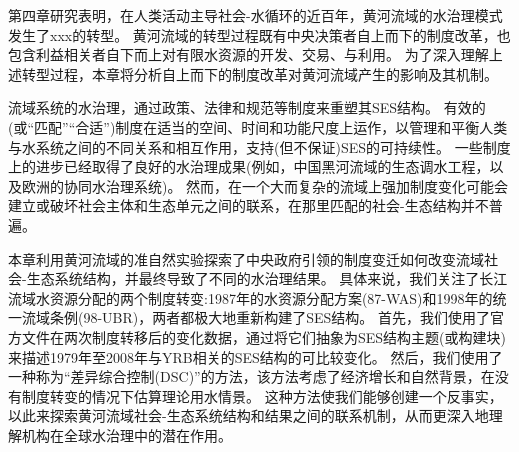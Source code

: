 第四章研究表明，在人类活动主导社会-水循环的近百年，黄河流域的水治理模式发生了xxx的转型。
黄河流域的转型过程既有中央决策者自上而下的制度改革，也包含利益相关者自下而上对有限水资源的开发、交易、与利用。
为了深入理解上述转型过程，本章将分析自上而下的制度改革对黄河流域产生的影响及其机制。

流域系统的水治理，通过政策、法律和规范等制度来重塑其SES结构。
有效的(或“匹配”“合适”)制度在适当的空间、时间和功能尺度上运作，以管理和平衡人类与水系统之间的不同关系和相互作用，支持(但不保证)SES的可持续性\cite{epstein2015, wang2019d}。
一些制度上的进步已经取得了良好的水治理成果(例如，中国黑河流域的生态调水工程\cite{wang2019d}，以及欧洲的协同水治理系统\cite{green2013})。
然而，在一个大而复杂的流域上强加制度变化可能会建立或破坏社会主体和生态单元之间的联系，在那里匹配的社会-生态结构并不普遍。


本章利用黄河流域的准自然实验探索了中央政府引领的制度变迁如何改变流域社会-生态系统结构，并最终导致了不同的水治理结果。
具体来说，我们关注了长江流域水资源分配的两个制度转变:1987年的水资源分配方案(87-WAS)和1998年的统一流域条例(98-UBR)，两者都极大地重新构建了SES结构。
首先，我们使用了官方文件在两次制度转移后的变化数据，通过将它们抽象为SES结构主题(或构建块)来描述1979年至2008年与YRB相关的SES结构的可比较变化。
然后，我们使用了一种称为“差异综合控制(DSC)”的方法\cite{arkhangelsky2021}，该方法考虑了经济增长和自然背景，在没有制度转变的情况下估算理论用水情景。
这种方法使我们能够创建一个反事实，以此来探索黄河流域社会-生态系统结构和结果之间的联系机制，从而更深入地理解机构在全球水治理中的潜在作用。
